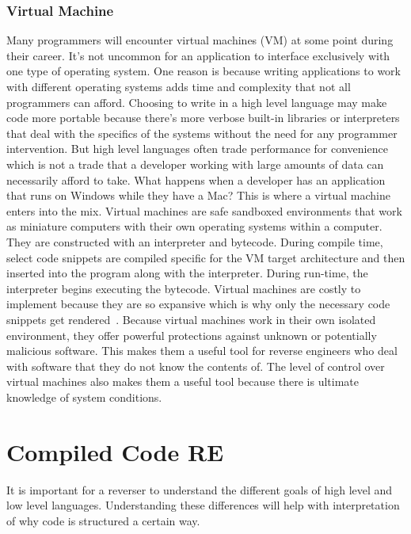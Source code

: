 \subsubsection{Virtual Machine}
Many programmers will encounter virtual machines (VM) at some point during their career. 
It’s not uncommon for an application to interface exclusively with one type of operating system. 
One reason is because writing applications to work with different operating systems adds time and complexity that not all programmers can afford.
Choosing to write in a high level language may make code more portable because there’s more verbose built-in libraries or interpreters that deal with the specifics of the systems without the need for any programmer intervention.
But high level languages often trade performance for convenience which is not a trade that a developer working with large amounts of data can necessarily afford to take.
What happens when a developer has an application that runs on Windows while they have a Mac? 
This is where a virtual machine enters into the mix. Virtual machines are safe sandboxed environments that work as miniature computers with their own operating systems within a computer. 
They are constructed with an interpreter and bytecode. 
During compile time, select code snippets are compiled specific for the VM target architecture and then inserted into the program along with the interpreter. 
During run-time, the interpreter begins executing the bytecode. 
Virtual machines are costly to implement because they are so expansive which is why only the necessary code snippets get rendered~\cite{MasteringRE}.
Because virtual machines work in their own isolated environment, they offer powerful protections against unknown or potentially malicious software. 
This makes them a useful tool for reverse engineers who deal with software that they do not know the contents of. 
The level of control over virtual machines also makes them a useful tool because there is ultimate knowledge of system conditions.


\section{Compiled Code RE}
It is important for a reverser to understand the different goals of high level and low level languages. 
Understanding these differences will help with interpretation of why code is structured a certain way.


